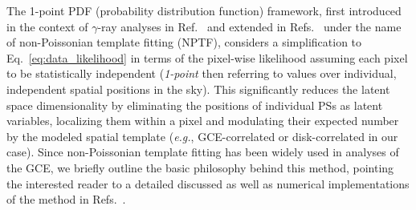 \documentclass[prd,aps,10pt,nofootinbib,twocolumn,superscriptaddress,preprintnumbers,balancelastpage,longbibliography]{revtex4-1}
\begin{document}
The 1-point PDF (probability distribution function) framework, first introduced in the context of $\gamma$-ray analyses in Ref.~\cite{Malyshev:2011zi} and extended in Refs.~\cite{Lee:2014mza,Lee:2015fea} under the name of non-Poissonian template fitting (NPTF), considers a simplification to Eq.~\eqref{eq:data_likelihood} in terms of the pixel-wise likelihood assuming each pixel to be statistically independent (\emph{1-point} then referring to values over individual, independent spatial positions in the sky). This significantly reduces the latent space dimensionality by eliminating the positions of individual PSs as latent variables, localizing them within a pixel and modulating their expected number by the modeled spatial template (\emph{e.g.}, GCE-correlated or disk-correlated in our case). Since non-Poissonian template fitting has been widely used in analyses of the GCE, we briefly outline the basic philosophy behind this method, pointing the interested reader to a detailed discussed as well as numerical implementations of the method in Refs.~\cite{Lee:2015fea,Mishra-Sharma:2016gis}.
\end{document}
